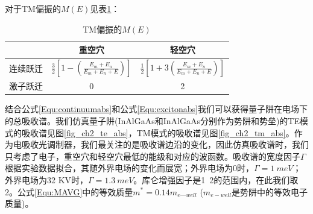 对于TM偏振的$M(E)$见表\ref{METM}：
{
	\begin{table}[htb]
		\caption{TM偏振的$M(E)$}
		\label{METM}
		\centering
		\begin{tabular}[t]{p{3cm}cc}
			\hline
			& 重空穴 & 轻空穴 \\
			\hline
			连续跃迁  & $\frac{3}{2} \left[ 1- \left( \frac{E_m + E_n}{E_m+E_n+E}\right)\right]$ & $\frac{1}{2} \left[ 1+3 \left( \frac{E_m + E_n}{E_m+E_n+E}\right)\right]$ \\
			激子跃迁  & 0 & 2\\
			\hline
		\end{tabular}
	\end{table}
}

结合公式\ref{Equ:continuumabs}和公式\ref{Equ:excitonabs}我们可以获得量子阱在电场下的总吸收谱。我们仿真量子阱(InAlGaAs和InAlGaAs分别作为势阱和势垒)的TE模式的吸收谱见图\ref{fig_ch2_te_abs}，TM模式的吸收谱见图\ref{fig_ch2_tm_abs}。作为电吸收光调制器，我们最关注的是吸收谱边沿的变化，因此仿真吸收谱时，我们只考虑了电子，重空穴和轻空穴最低的能级和对应的波函数。吸收谱的宽度因子$\Gamma$根据实验数据拟合，其随外界电场的变化而展宽；外界电场为0时，$ \Gamma = 1 ~meV$；外界电场为32 KV时，$ \Gamma = 1.3 ~meV$。库仑增强因子是1~2的范围内\cite{mares1993modeling, chuang1995physics}，在此我们取2。公式\ref{Equ:MAVG}中的等效质量$m^* = 0.14m_{e—well}$ ($m_{e-well}$是势阱中的等效电子质量)。

